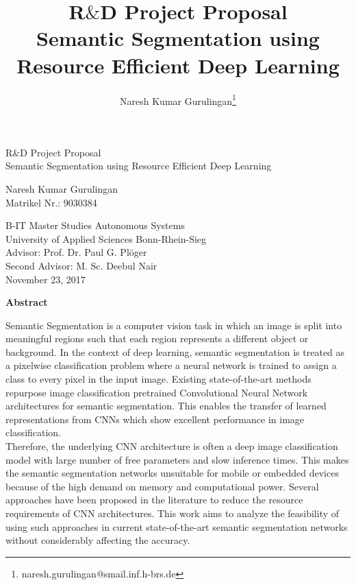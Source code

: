 \documentclass[a4paper,12pt]{article}
\title{R$\&$D Project Proposal\\ \vspace{5mm}Semantic Segmentation using Resource Efficient Deep Learning}
\author{Naresh Kumar Gurulingan\footnote{naresh.gurulingan@smail.inf.h-brs.de}}
\begin{document}
\begin{titlepage}
	\begin{center}
		
	\end{center}
	\begin{center}
		\begin{LARGE}
			R$\&$D Project Proposal\\
			\vspace{5mm}
			Semantic Segmentation using Resource Efficient Deep Learning
		\end{LARGE}
	\end{center}
	\begin{center}
		Naresh Kumar Gurulingan\\
		Matrikel Nr.: 9030384
	\end{center}
	
	\begin{center}
		B-IT Master Studies Autonomous Systems\\
		\vspace{5mm}
		University of Applied Sciences Bonn-Rhein-Sieg\\
		Advisor: Prof. Dr. Paul G. Pl{\"o}ger\\
		Second Advisor: M. Sc. Deebul Nair\\
		\vspace{5mm}
		November 23, 2017
\end{center}

\begin{large}
	\begin{center}
		\textbf{Abstract}
	\end{center}
\end{large}
\hspace{8mm}Semantic Segmentation is a computer vision task in which an image is split into meaningful regions such that each region represents a different object or background. In the context of deep learning, semantic segmentation is treated as a pixelwise classification problem where a neural network is trained to assign a class to every pixel in the input image. Existing state-of-the-art methods repurpose image classification pretrained Convolutional Neural Network architectures for semantic segmentation. This enables the transfer of learned representations from CNNs which show excellent performance in image classification.\\

Therefore, the underlying CNN architecture is often a deep image classification model with large number of free parameters and slow inference times. This makes the semantic segmentation networks unsuitable for mobile or embedded devices because of the high demand on memory and computational power. Several approaches have been proposed in the literature to reduce the resource requirements of CNN architectures. This work aims to analyze the feasibility of using such approaches in current state-of-the-art semantic segmentation networks without considerably affecting the accuracy.

\end{titlepage}
\tableofcontents
\end{document}
